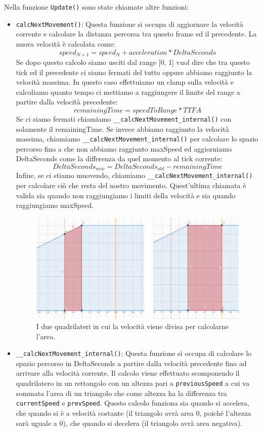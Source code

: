 \documentclass[main.tex]{subfiles}
\begin{document}
Nella funzione \lstinline{Update()} sono state chiamate altre funzioni:
\begin{itemize}
    \item \lstinline{calcNextMovement()}: Questa funzione si occupa di aggiornare la velocità corrente e calcolare la distanza percorsa tra questo frame ed il precedente. La nuova velocità è calcolata come:
    \[speed_{N+1} = speed_{N} + acceleration * DeltaSeconds\]
    Se dopo questo calcolo siamo usciti dal range [0, 1] vuol dire che tra questo tick ed il precedente ci siamo fermati del tutto oppure abbiamo raggiunto la velocità massima. In questo caso effettuiamo un clamp sulla velocità e calcoliamo quanto tempo ci mettiamo a raggiungere il limite del range a partire dalla velocità precedente:
    \[remainingTime = speedToRange * TTFA\]
    Se ci siamo fermati chiamiamo \lstinline{__calcNextMovement_internal()} con solamente il remainingTime. Se invece abbiamo raggiunto la velocità massima, chiamiamo \lstinline{__calcNextMovement_internal()} per calcolare lo spazio percorso fino a che non abbiamo raggiunto maxSpeed ed aggiorniamo DeltaSeconds come la differenza da quel momento al tick corrente:
    \[DeltaSeconds_{new} = DeltaSeconds_{old} - remainingTime\]
    Infine, se ci stiamo muovendo, chiamiamo \lstinline{__calcNextMovement_internal()} per calcolare ciò che resta del nostro movimento. Quest'ultima chiamata è valida sia quando non raggiungiamo i limiti della velocità e sia quando raggiungiamo maxSpeed.
    \begin{figure}[H]
        \centering
        \includegraphics[width=.8\linewidth]{img/interpolazione/calcNextMovementLateCall.png}
        \caption{I due quadrilateri in cui la velocità viene divisa per calcolarne l'area.}
        \label{fig:4_calcNextMovementLateCall}
    \end{figure}
    \item \lstinline{__calcNextMovement_internal()}: Questa funzione si occupa di calcolare lo spazio percorso in DeltaSeconds a partire dalla velocità precedente fino ad arrivare alla velocità corrente. Il calcolo viene effettuato scomponendo il quadrilatero in un rettangolo con un altezza pari a \lstinline{previousSpeed} a cui va sommata l'area di un triangolo che come altezza ha la differenza tra \lstinline{currentSpeed} e \lstinline{prevSpeed}. Questo calcolo funziona sia quando si accelera, che quando si è a velocità costante (il triangolo avrà area 0, poiché l'altezza sarà uguale a 0), che quando si decelera (il triangolo avrà area negativa).

\end{itemize}
\end{document}
